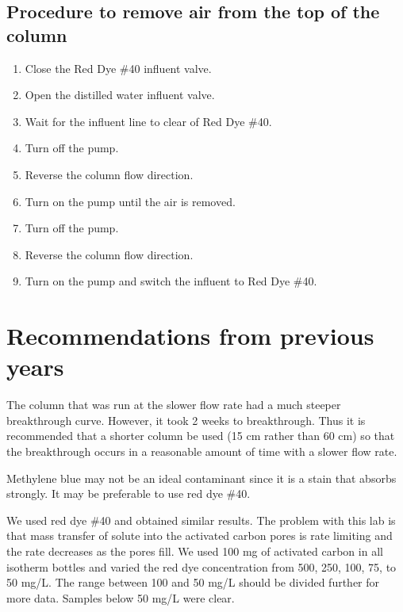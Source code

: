 \documentclass[letterpaper,10pt,english]{sphinxmanual}
\begin{document}
\subsection{Procedure to remove air from the top of the column}
\label{\detokenize{Adsorption/Adsorption:procedure-to-remove-air-from-the-top-of-the-column}}\begin{enumerate}
\item {} 
Close the Red Dye \#40 influent valve.

\item {} 
Open the distilled water influent valve.

\item {} 
Wait for the influent line to clear of Red Dye \#40.

\item {} 
Turn off the pump.

\item {} 
Reverse the column flow direction.

\item {} 
Turn on the pump until the air is removed.

\item {} 
Turn off the pump.

\item {} 
Reverse the column flow direction.

\item {} 
Turn on the pump and switch the influent to Red Dye \#40.

\end{enumerate}


\section{Recommendations from previous years}
\label{\detokenize{Adsorption/Adsorption:recommendations-from-previous-years}}\label{\detokenize{Adsorption/Adsorption:heading-adsorption-recommendations-from-previous-years}}
The column that was run at the slower flow rate had a much steeper breakthrough curve. However, it took 2 weeks to breakthrough. Thus it is recommended that a shorter column be used (15 cm rather than 60 cm) so that the breakthrough occurs in a reasonable amount of time with a slower flow rate.

Methylene blue may not be an ideal contaminant since it is a stain that absorbs strongly. It may be preferable to use red dye \#40.

We used red dye \#40 and obtained similar results. The problem with this lab is that mass transfer of solute into the activated carbon pores is rate limiting and the rate decreases as the pores fill. We used 100 mg of activated carbon in all isotherm bottles and varied the red dye concentration from 500, 250, 100, 75, to 50 mg/L. The range between 100 and 50 mg/L should be divided further for more data. Samples below 50 mg/L were clear.
\end{document}
